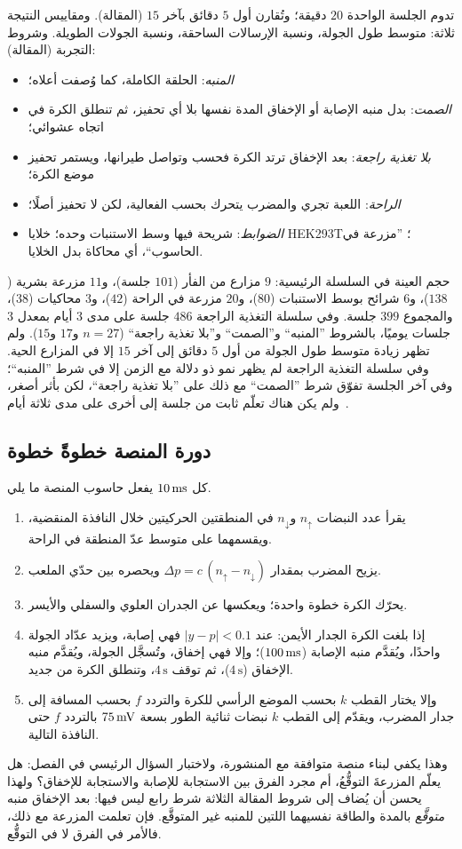 تدوم الجلسة الواحدة $20$ دقيقة؛ وتُقارن أول $5$ دقائق بآخر $15$ (المقالة). ومقاييس النتيجة ثلاثة: متوسط طول الجولة، ونسبة الإرسالات الساحقة، ونسبة الجولات الطويلة. وشروط التجربة (المقالة):
\begin{itemize}
\item \emph{المنبه}: الحلقة الكاملة، كما وُصفت أعلاه؛
\item \emph{الصمت}: بدل منبه الإصابة أو الإخفاق المدة نفسها بلا أي تحفيز، ثم تنطلق الكرة في اتجاه عشوائي؛
\item \emph{بلا تغذية راجعة}: بعد الإخفاق ترتد الكرة فحسب وتواصل طيرانها، ويستمر تحفيز موضع الكرة؛
\item \emph{الراحة}: اللعبة تجري والمضرب يتحرك بحسب الفعالية، لكن لا تحفيز أصلًا؛
\item \emph{الضوابط}: شريحة فيها وسط الاستنبات وحده؛ خلايا \foreignlanguage{english}{HEK293T}؛ ”مزرعة في الحاسوب“، أي محاكاة بدل الخلايا.
\end{itemize}
حجم العينة في السلسلة الرئيسية: $9$ مزارع من الفأر ($101$ جلسة)، و$11$ مزرعة بشرية ($138$)، و$6$ شرائح بوسط الاستنبات ($80$)، و$20$ مزرعة في الراحة ($42$)، و$3$ محاكيات ($38$)، والمجموع $399$ جلسة. وفي سلسلة التغذية الراجعة $486$ جلسة على مدى $3$ أيام بمعدل $3$ جلسات يوميًا، بالشروط ”المنبه“ و”الصمت“ و”بلا تغذية راجعة“ ($n=27$ و$17$ و$15$). ولم تظهر زيادة متوسط طول الجولة من أول $5$ دقائق إلى آخر $15$ إلا في المزارع الحية. وفي سلسلة التغذية الراجعة لم يظهر نمو ذو دلالة مع الزمن إلا في شرط ”المنبه“؛ وفي آخر الجلسة تفوّق شرط ”الصمت“ مع ذلك على ”بلا تغذية راجعة“، لكن بأثر أصغر، ولم يكن هناك تعلّم ثابت من جلسة إلى أخرى على مدى ثلاثة أيام~\cite{Kagan2022}.

\subsection*{دورة المنصة خطوةً خطوة}

كل $10\,\text{ms}$ يفعل حاسوب المنصة ما يلي.
\begin{enumerate}
\item يقرأ عدد النبضات $n_\uparrow$ و$n_\downarrow$ في المنطقتين الحركيتين خلال النافذة المنقضية، ويقسمهما على متوسط عدّ المنطقة في الراحة.
\item يزيح المضرب بمقدار $\Delta p=c\,(n_\uparrow-n_\downarrow)$ ويحصره بين حدّي الملعب.
\item يحرّك الكرة خطوة واحدة؛ ويعكسها عن الجدران العلوي والسفلي والأيسر.
\item إذا بلغت الكرة الجدار الأيمن: عند $|y-p|<0.1$ فهي إصابة، ويزيد عدّاد الجولة واحدًا، ويُقدَّم منبه الإصابة ($100\,\text{ms}$)؛ وإلا فهي إخفاق، وتُسجَّل الجولة، ويُقدَّم منبه الإخفاق ($4\,\text{s}$)، ثم توقف $4\,\text{s}$، وتنطلق الكرة من جديد.
\item وإلا يختار القطب $k$ بحسب الموضع الرأسي للكرة والتردد $f$ بحسب المسافة إلى جدار المضرب، ويقدّم إلى القطب $k$ نبضات ثنائية الطور بسعة $75\,\text{mV}$ بالتردد $f$ حتى النافذة التالية.
\end{enumerate}
وهذا يكفي لبناء منصة متوافقة مع المنشورة، ولاختبار السؤال الرئيسي في الفصل: هل يعلّم المزرعةَ التوقُّعُ، أم مجرد الفرق بين الاستجابة للإصابة والاستجابة للإخفاق؟ ولهذا يحسن أن يُضاف إلى شروط المقالة الثلاثة شرط رابع ليس فيها: بعد الإخفاق منبه \emph{متوقَّع} بالمدة والطاقة نفسيهما اللتين للمنبه غير المتوقَّع. فإن تعلمت المزرعة مع ذلك، فالأمر في الفرق لا في التوقُّع.
